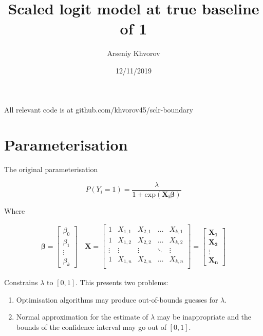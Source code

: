 \documentclass[]{article}
\title{Scaled logit model at true baseline of 1}
\author{Arseniy Khvorov}
\date{12/11/2019}
\begin{document}
\maketitle

All relevant code is at github.com/khvorov45/sclr-boundary

\hypertarget{parameterisation}{%
\section{Parameterisation}\label{parameterisation}}

The original parameterisation

\begin{equation}
  P(Y_i=1)=\frac{\lambda}{1 + \text{exp}(\boldsymbol{\boldsymbol{X_i}\beta})} 
  \label{eq:binom}
\end{equation}

Where

\begin{align*}
  \boldsymbol{\beta} =
    \begin{bmatrix}
    \beta_0 \\
    \beta_1 \\
    \vdots \\
    \beta_k
    \end{bmatrix}
\quad
  \boldsymbol{X} =
    \begin{bmatrix}
    1 & X_{1, 1} & X_{2, 1} & \ldots & X_{k, 1} \\
    1 & X_{1, 2} & X_{2, 2} & \ldots & X_{k, 2} \\
    \vdots & \vdots & \vdots & \ddots & \vdots \\
    1 & X_{1, n} & X_{2, n} & \ldots & X_{k, n} \\
    \end{bmatrix}
= 
    \begin{bmatrix}
    \boldsymbol{X_1} \\
    \boldsymbol{X_2} \\
    \vdots \\
    \boldsymbol{X_n}
    \end{bmatrix}
\end{align*}

Constrains \(\lambda\) to \([0, 1]\). This presents two problems:

\begin{enumerate}
\def\labelenumi{\arabic{enumi}.}
\item
  Optimisation algorithms may produce out-of-bounds guesses for \(\lambda\).
\item
  Normal approximation for the estimate of \(\lambda\) may be inappropriate and the bounds of the confidence interval may go out of \([0, 1]\).
\end{enumerate}
\end{document}
